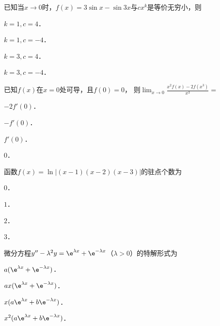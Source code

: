 \documentclass[plain,noanswer,medmath]{../../template/jnuexam}
\begin{document}






\begin{problem}
已知当$x \to 0$时，$f(x) = 3\sin x - \sin 3x$与$cx^k$是等价无穷小，则\pickout{}
\begin{abcd}
\item $k = 1,c = 4$．
\item $k = 1,c = - 4$．
\item $k = 3,c = 4$．
\item $k = 3,c = - 4$．
\end{abcd}
\end{problem}


\begin{problem}
已知$f(x)$在$x = 0$处可导，且$f(0) = 0$，
则$\lim_{x \to 0} \frac{x^2 f(x) - 2f\left(x^3 \right)}{x^3} =$\pickout{}
\begin{abcd}
\item $- 2f'(0)$．
\item $- f'(0)$．
\item $f'(0)$．
\item $0$．
\end{abcd}
\end{problem}


\begin{problem}
函数$f(x) = \ln \left| (x - 1)(x - 2)(x - 3) \right|$的驻点个数为\pickout{}
\begin{abcd}
\item $0$．
\item $1$．
\item $2$．
\item $3$．
\end{abcd}
\end{problem}


\begin{problem}
微分方程$y'' - \lambda^2 y = \e^{\lambda x} + \e^{- \lambda x}$（$\lambda > 0$）的特解形式为\pickout{}
\begin{abcd}
\item $a(\e^{\lambda x} + \e^{- \lambda x})$．
\item $ax(\e^{\lambda x} + \e^{- \lambda x})$．
\item $x(a\e^{\lambda x} + b\e^{- \lambda x})$．
\item $x^2(a\e^{\lambda x} + b\e^{- \lambda x})$．
\end{abcd}
\end{problem}
\end{document}
